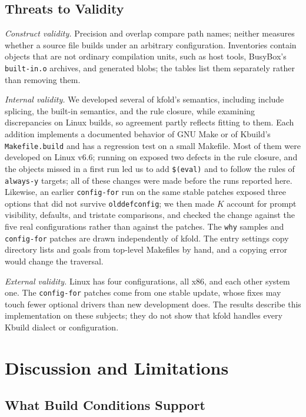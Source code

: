 \documentclass[acmsmall]{acmart}
\newcommand{\tool}{\textsf{kfold}\xspace}
\begin{document}
\subsection{Threats to Validity}
\label{sec:eval:threats}
\emph{Construct validity.} Precision and overlap compare path names; neither measures whether a source file builds under an arbitrary configuration.
Inventories contain objects that are not ordinary compilation units, such as host tools, BusyBox's \texttt{built-in.o} archives, and generated blobs; the tables list them separately rather than removing them.

\emph{Internal validity.} We developed several of \tool's semantics, including include splicing, the built-in semantics, and the rule closure, while examining discrepancies on Linux builds, so agreement partly reflects fitting to them.
Each addition implements a documented behavior of GNU Make or of Kbuild's \texttt{Makefile.build} and has a regression test on a small Makefile.
Most of them were developed on Linux v6.6; running on \NLinuxVersion exposed two defects in the rule closure, and the objects missed in a first run led us to add \texttt{\$(eval)} and to follow the rules of \texttt{always-y} targets; all of these changes were made before the runs reported here.
Likewise, an earlier \texttt{config-for} run on the same stable patches exposed three options that did not survive \texttt{olddefconfig}; we then made $K$ account for prompt visibility, defaults, and tristate comparisons, and checked the change against the five real configurations rather than against the patches.
The \texttt{why} samples and \texttt{config-for} patches are drawn independently of \tool.
The entry settings copy directory lists and goals from top-level Makefiles by hand, and a copying error would change the traversal.

\emph{External validity.} Linux has four configurations, all x86, and each other system one.
The \texttt{config-for} patches come from one stable update, whose fixes may touch fewer optional drivers than new development does.
The results describe this implementation on these subjects; they do not show that \tool handles every Kbuild dialect or configuration.

\section{Discussion and Limitations}\label{sec:discussion}

\subsection{What Build Conditions Support}\label{sec:discussion:support}
\end{document}
